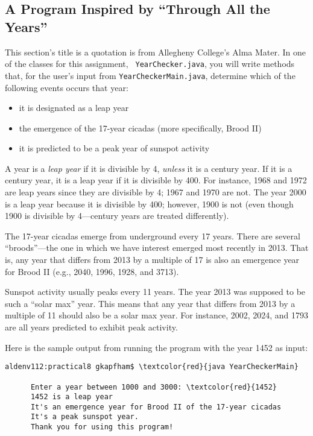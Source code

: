 \subsection*{A Program Inspired by ``Through All the Years''}
\vspace*{-.05in}

This section's title is a quotation is from Allegheny College's Alma Mater. In one of the classes for this assignment, {\tt
YearChecker.java}, you will write methods that, for the user's input from {\tt YearCheckerMain.java}, determine which of
the following events occurs that year: \begin{itemize}

\item
it is designated as a leap year

\item
the emergence of the 17-year cicadas (more specifically, Brood II)

\item
it is predicted to be a peak year of sunspot activity

\end{itemize}

\noindent A year is a {\em leap year} if it is divisible by 4, {\em unless} it is a century year. If it is a century
year, it is a leap year if it is divisible by 400. For instance, 1968 and 1972 are leap years since they are divisible
by 4; 1967 and 1970 are not.  The year 2000 is a leap year because it is divisible by 400; however, 1900 is not (even
though 1900 is divisible by 4---century years are treated differently).

\noindent The 17-year cicadas emerge from underground every 17 years. There are several ``broods''---the one in which we
have interest emerged most recently in 2013. That is, any year that differs from 2013 by a multiple of 17 is also an
emergence year for Brood II (e.g., 2040, 1996, 1928, and 3713).

\noindent Sunspot activity usually peaks every 11 years. The year 2013 was supposed to be such a ``solar max'' year.
This means that any year that differs from 2013 by a multiple of 11 should also be a solar max year. For instance, 2002,
2024, and 1793 are all years predicted to exhibit peak activity.

\noindent Here is the sample output from running the program with the year 1452 as input:

\begin{Verbatim}[commandchars=\\\{\}]
      aldenv112:practical8 gkapfham$ \textcolor{red}{java YearCheckerMain}

      Enter a year between 1000 and 3000: \textcolor{red}{1452}
      1452 is a leap year
      It's an emergence year for Brood II of the 17-year cicadas
      It's a peak sunspot year.
      Thank you for using this program!
\end{Verbatim}

